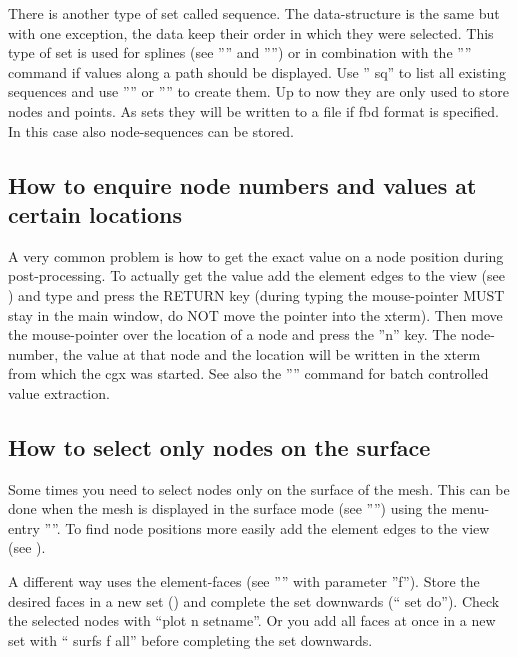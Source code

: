 \documentclass{article}
\begin{document}
\begin{appendix}
There is another type of set called sequence. The data-structure is the same but with one exception, the data keep their order in which they were selected. This type of set is used for splines (see '''' and '''') or in combination with the '''' command if values along a path should be displayed. Use '' sq'' to list all existing sequences and use '''' or '''' to create them. Up to now they are only used to store nodes and points. As sets they will be written to a file if fbd format is specified. In this case also node-sequences can be stored.

\subsection{\label{How to enquire node numbers and values at certain locations}How to enquire node numbers and values at certain locations}
A very common problem is how to get the exact value on a node position during post-processing. To actually get the value add the element edges to the view (see ) and type  and press the RETURN key (during typing the mouse-pointer MUST stay in the main window, do NOT move the pointer into the xterm). Then move the mouse-pointer over the location of a node and press the ''n'' key. The node-number, the value at that node and the location will be written in the xterm from which the cgx was started. See also the '''' command for batch controlled value extraction.

\subsection{\label{How to select only nodes on the surface}How to select only nodes on the surface}
Some times you need to select nodes only on the surface of the mesh. This can be done when the mesh is displayed in the surface mode (see '''') using the menu-entry ''''. To find node positions more easily add the element edges to the view (see ).

A different way uses the element-faces (see '''' with parameter ''f''). Store the desired faces in a new set () and complete the set downwards (`` set do''). Check the selected nodes with ``plot n setname''. Or you add all faces at once in a new set with `` surfs f all'' before completing the set downwards.


\end{appendix}
\end{document}
